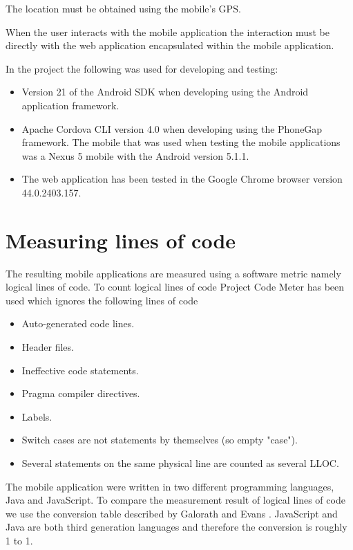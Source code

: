 The location must be obtained using the mobile’s GPS. 

When the user interacts with the mobile application the interaction must be directly with the web application encapsulated within the mobile application. 

In the project the following was used for developing and testing:
\begin{itemize}
\item Version 21 of the Android SDK when developing using the Android application framework.
\item Apache Cordova CLI version 4.0 when developing using the PhoneGap framework. 
The mobile that was used when testing the mobile applications was a Nexus 5 mobile with the Android version 5.1.1.
\item The web application has been tested in the Google Chrome browser version 44.0.2403.157.
\end{itemize}

\section{Measuring lines of code}\label{section-measuring-lines-of-code}
The resulting mobile applications are measured using a software metric namely logical lines of code. To count logical lines of code Project Code Meter has been used which ignores the following lines of code \cite{project-code-meter2015}

\begin{itemize}
\item Auto-generated code lines.
\item Header files.
\item Ineffective code statements.
\item Pragma compiler directives.
\item Labels.
\item Switch cases are not statements by themselves (so empty "case").
\item Several statements on the same physical line are counted as several LLOC.
\end{itemize}

The mobile application were written in two different programming languages, Java and JavaScript. To compare the measurement result of logical lines of code we use the conversion table described by Galorath and Evans \cite[p.~163]{galorath2006}. JavaScript and Java are both third generation languages and therefore the conversion is roughly 1 to 1. 

